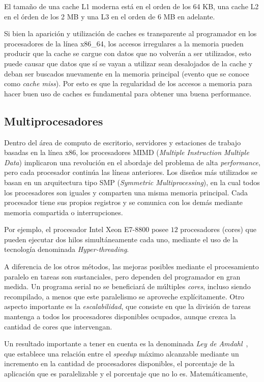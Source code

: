 El tama\~no de una cache L1 moderna est\'a en el orden de los 64 KB, una cache L2 en el \'orden de los 2 MB y una L3 en el orden de 6 MB en adelante.

Si bien la aparici\'on y utilizaci\'on de caches es transparente al programador en los procesadores de la l\'inea x86\_64, los accesos irregulares a la memoria pueden producir que la cache se cargue con datos que no volver\'an a ser utilizados, esto puede causar que datos que s\'i se vayan a utilizar sean desalojados de la cache y deban ser buscados nuevamente en la memoria principal (evento que se conoce como \textit{cache miss}).
Por esto es que la regularidad de los accesos a memoria para hacer buen uso de caches es fundamental para obtener una buena performance.

\subsection{Multiprocesadores}

Dentro del \'area de computo de escritorio, servidores y estaciones de trabajo basadas en la l\'inea x86, los procesadores MIMD (\textit{Multiple Instruction Multiple Data}) implicaron una revoluci\'on en el abordaje del problema de alta \textit{performance}, pero cada procesador contin\'ua las l\'ineas anteriores.
Los dise\~nos m\'as utilizados se basan en un arquitectura tipo SMP (\textit{Symmetric Multiprocessing}), en la cual todos los procesadores son iguales y comparten una misma memoria principal.
Cada procesador tiene sus propios registros y se comunica con los dem\'as mediante memoria compartida o interrupciones.

Por ejemplo, el procesador Intel Xeon E7-8800 posee $12$ procesadores (cores) que pueden ejecutar dos hilos simult\'aneamente cada uno, mediante el uso de la tecnolog\'ia denominada \textit{Hyper-threading}.

A diferencia de los otros m\'etodos, las mejoras posibles mediante el procesamiento paralelo en tareas son sustanciales, pero dependen del programador en gran medida.
Un programa serial no se beneficiar\'a de m\'ultiples \textit{cores}, incluso siendo recompilado, a menos que este paralelismo se aproveche expl\'icitamente.
Otro aspecto importante es la \textit{escalabilidad}, que consiste en que la divisi\'on de tareas mantenga a todos los procesadores disponibles ocupados, aunque crezca la cantidad de cores que intervengan.

Un resultado importante a tener en cuenta es la denominada \textit{Ley de Amdahl}~\cite{Amdahl1967}, que establece una relaci\'on entre el \textit{speedup} m\'aximo alcanzable mediante un incremento en la cantidad de procesadores disponibles, el porcentaje
de la aplicaci\'on que es paralelizable y el porcentaje que no lo es. Matem\'aticamente,

